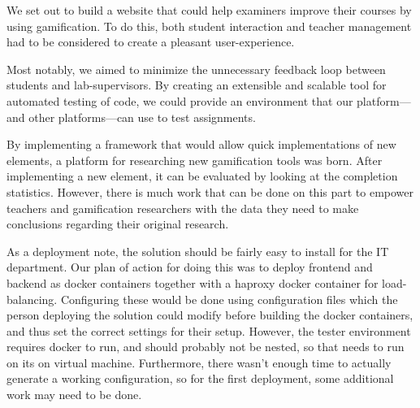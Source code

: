 We set out to build a website that could help examiners improve their courses by using gamification. To do this, both student interaction and teacher management had to be considered to create a pleasant user-experience.

Most notably, we aimed to minimize the unnecessary feedback loop between students and lab-supervisors. By creating an extensible and scalable tool for automated testing of code, we could provide an environment that our platform---and other platforms---can use to test assignments.

By implementing a framework that would allow quick implementations of new elements, a platform for researching new gamification tools was born. After implementing a new element, it can be evaluated by looking at the completion statistics. However, there is much work that can be done on this part to empower teachers and gamification researchers with the data they need to make conclusions regarding their original research.

As a deployment note, the solution should be fairly easy to install for the IT department. Our plan of action for doing this was to deploy frontend and backend as docker containers together with a haproxy docker container for load-balancing. Configuring these would be done using configuration files which the person deploying the solution could modify before building the docker containers, and thus set the correct settings for their setup. However, the tester environment requires docker to run, and should probably not be nested\cite{nesteddocker}, so that needs to run on its on virtual machine. Furthermore, there wasn't enough time to actually generate a working configuration, so for the first deployment, some additional work may need to be done.
